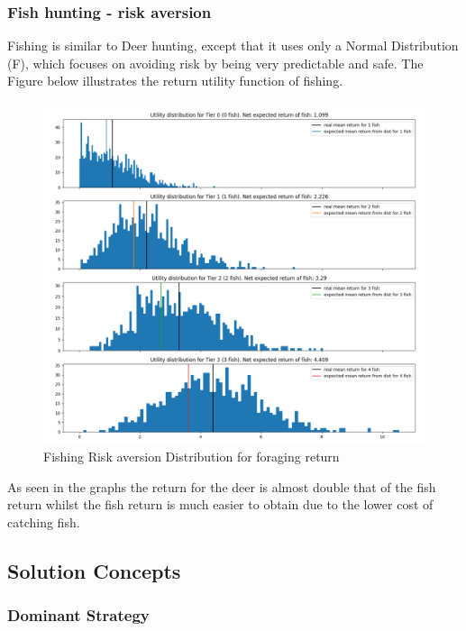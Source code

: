 \newpage
\subsubsection{Fish hunting - risk aversion}

Fishing is similar to Deer hunting, except that it uses only a Normal Distribution (F), which focuses on avoiding risk by being very predictable and safe. The Figure below illustrates the return utility function of fishing.\\

\begin{figure}[!htb]
    \centering
    \includegraphics[width=1\textwidth]{04_environment/Images/Distribution of Foraging returns Fishing.PNG}
    \caption{Fishing Risk aversion Distribution for foraging return}
    \label{Images:Distribution of Foraging returns Fishing}
\end{figure}

As seen in the graphs the return for the deer is almost double that of the fish return whilst the fish return is much easier to obtain due to the lower cost of catching fish. \\

\newpage
\subsection{Solution Concepts}
\subsubsection{Dominant Strategy}

